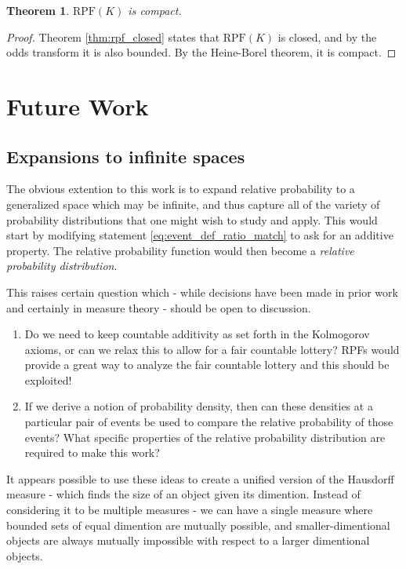 \documentclass[twoside]{article}
\theoremstyle{plain}%
\newtheorem{theorem}{Theorem}[section]
\theoremstyle{definition}
\theoremstyle{remark}
\begin{document}
\begin{theorem}
\(\text{RPF}(K)\) is compact.
\end{theorem}

\begin{proof}
Theorem \ref{thm:rpf_closed} states that \(\text{RPF}(K)\) is closed, and by the odds transform it is also bounded. By the Heine-Borel theorem, it is compact.
\end{proof}

\section{Future Work}
\subsection{Expansions to infinite spaces}
The obvious extention to this work is to expand relative probability to a generalized space which may be infinite, and thus capture all of the variety of probability distributions that one might wish to study and apply. This would start by modifying statement \ref{eq:event_def_ratio_match} to ask for an additive property. The relative probability function would then become a \textit{relative probability distribution}.

This raises certain question which - while decisions have been made in prior work and certainly in measure theory - should be open to discussion.
\begin{enumerate}
\item Do we need to keep countable additivity as set forth in the Kolmogorov axioms, or can we relax this to allow for a fair countable lottery? RPFs would provide a great way to analyze the fair countable lottery and this should be exploited!
\item If we derive a notion of probability density, then can these densities at a particular pair of events be used to compare the relative probability of those events? What specific properties of the relative probability distribution are required to make this work?
\end{enumerate}

It appears possible to use these ideas to create a unified version of the Hausdorff measure - which finds the size of an object given its dimention. Instead of considering it to be multiple measures - we can have a single measure where bounded sets of equal dimention are mutually possible, and smaller-dimentional objects are always mutually impossible with respect to a larger dimentional objects.
\end{document}
